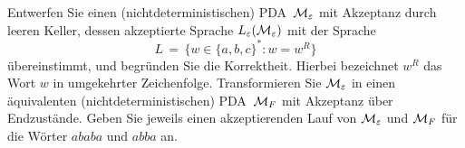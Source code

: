 \begin{exercise}

Entwerfen Sie einen (nichtdeterministischen) PDA~$\mathcal{M}_{\varepsilon}$ 
mit Akzeptanz durch leeren Keller, dessen akzeptierte Sprache
$L_{\varepsilon}(\mathcal{M}_{\varepsilon})$ mit der Sprache
\[ 
  L \, = \, \bigl\{ w \in \{a,b,c\}^* : w = w^R \bigr\}
\]
\"ubereinstimmt, und begr\"unden Sie die Korrektheit. Hierbei bezeichnet $w^R$ das
Wort $w$ in umgekehrter Zeichenfolge.
%
Transformieren Sie $\mathcal{M}_{\varepsilon}$ in einen \"aquivalenten 
(nichtdeterministischen) PDA~$\mathcal{M}_F$ mit Akzeptanz 
\"uber Endzust\"ande.
Geben Sie jeweils einen akzeptierenden Lauf von
$\mathcal{M}_{\varepsilon}$ und  $\mathcal{M}_F$ f\"ur die W\"orter $ababa$ 
und $abba$ an.

\end{exercise}
